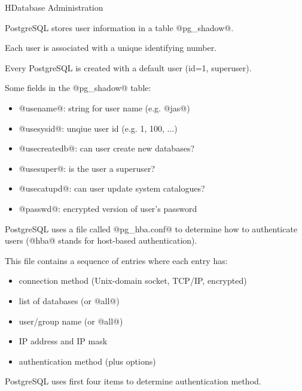 \begin{lecture}{H}{Database Administration}
\begin{slide}
PostgreSQL stores user information in a table @pg_shadow@.

Each user is associated with a unique identifying number.

Every PostgreSQL is created with a default user (id=1, superuser).

Some fields in the @pg_shadow@ table:
\begin{itemize}
\vspace{-1ex}\item @usename@: string for user name (e.g. @jas@)
\vspace{-1ex}\item @usesysid@: unqiue user id (e.g. 1, 100, ...)
\vspace{-1ex}\item @usecreatedb@: can user create new databases?
\vspace{-1ex}\item @usesuper@: is the user a superuser?
\vspace{-1ex}\item @usecatupd@: can user update system catalogues?
\vspace{-1ex}\item @passwd@: encrypted version of user's password
\end{itemize}
\end{slide}

\begin{slide}
PostgreSQL uses a file called @pg_hba.conf@ to determine
how to authenticate users
{\small (@hba@ stands for host-based authentication)}.

This file contains a sequence of entries where each entry has:
\begin{itemize}
\item connection method {\small (Unix-domain socket, TCP/IP, encrypted)}
\item list of databases (or @all@)
\item user/group name (or @all@)
\item IP address and IP mask
\item authentication method (plus options)
\end{itemize}
PostgreSQL uses first four items to determine authentication method.
\end{slide}


\end{lecture}
